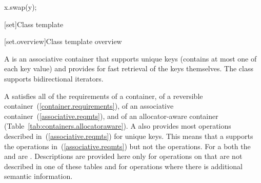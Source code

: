 \begin{itemdescr}
\pnum
\effects
\begin{codeblock}
x.swap(y);
\end{codeblock}
\end{itemdescr}

[set]{Class template }

[set.overview]{Class template  overview}

\pnum
{}%
A
is an associative container that supports unique keys (contains at most one of each key value) and
provides for fast retrieval of the keys themselves.
The
 class
supports bidirectional iterators.

\pnum
A  satisfies all of the requirements of a container, of a reversible
container~(\ref{container.requirements}), of an associative
container~(\ref{associative.reqmts}), and of an allocator-aware container
(Table~\ref{tab:containers.allocatoraware}).
A
also provides most operations described in~(\ref{associative.reqmts})
for unique keys.
This means that a
supports the
operations in~(\ref{associative.reqmts})
but not the
operations.
For a
both the
and
are
.
Descriptions are provided here only for operations on
that are not described in one of these tables
and for operations where there is additional semantic information.

